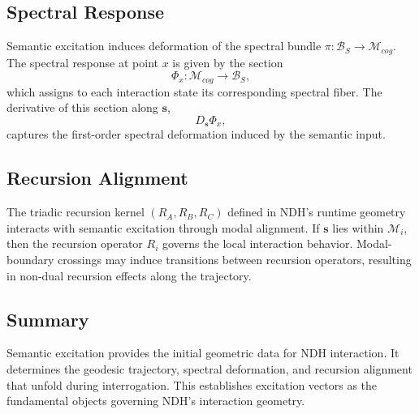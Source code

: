 \subsection{Spectral Response}

Semantic excitation induces deformation of the spectral bundle
$\pi : \mathcal{B}_S \to \mathcal{M}_{cog}$. The spectral response at point
$x$ is given by the section
\[
\Phi_x : \mathcal{M}_{cog} \to \mathcal{B}_S,
\]
which assigns to each interaction state its corresponding spectral fiber. The
derivative of this section along $\mathbf{s}$,
\[
D_{\mathbf{s}} \Phi_x,
\]
captures the first-order spectral deformation induced by the semantic input.

\subsection{Recursion Alignment}

The triadic recursion kernel $(R_A, R_B, R_C)$ defined in NDH's runtime
geometry interacts with semantic excitation through modal alignment. If
$\mathbf{s}$ lies within $\mathcal{M}_i$, then the recursion operator $R_i$
governs the local interaction behavior. Modal-boundary crossings may induce
transitions between recursion operators, resulting in non-dual recursion
effects along the trajectory.

\subsection{Summary}

Semantic excitation provides the initial geometric data for NDH interaction.
It determines the geodesic trajectory, spectral deformation, and recursion
alignment that unfold during interrogation. This establishes excitation vectors
as the fundamental objects governing NDH's interaction geometry.
